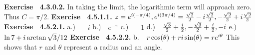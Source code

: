 {\noindent \protect \bf  Exercise ~4.3.0.2.} In taking the limit, the logarithmic term will approach zero. Thus $C=\pi /2$. \protect \newline  \protect \newline  
 {\noindent \protect \bf  Exercise ~4.5.1.1.} $z=e^{i (-\pi /4)}, e^{i(3 \pi /4)} = \protect \frac  {\protect \sqrt  {2}}{2} - i \protect \frac  {\protect \sqrt  {2}}{2},-\protect \frac  {\protect \sqrt  {2}}{2} + i \protect \frac  {\protect \sqrt  {2}}{2}$  \protect \newline  \protect \newline  
 {\noindent \protect \bf  Exercise ~4.5.2.1.} a.)~~$-i$ \protect \newline  b.)~~$e^{-\pi }$ \protect \newline  c.)~~$-1$ \protect \newline  d.)~~$\protect \frac  {\protect \sqrt  {3}}{2} + \protect \frac  {i}{2}, -\protect \frac  {\protect \sqrt  {3}}{2} + \protect \frac  {i}{2}, -i$ \protect \newline  e.)~~$\protect \qopname  \relax o{ln}{7} + i \protect \qopname  \relax o{arctan}{\protect \sqrt  {3}/12}$  \protect \newline  \protect \newline  
 {\noindent \protect \bf  Exercise ~4.5.2.2.} b.~~$r\protect \qopname  \relax o{cos}(\theta )+ri \protect \qopname  \relax o{sin}(\theta ) = re^{i \theta }$ This shows that $r$ and $\theta $ represent a radius and an angle.  \protect \newline  \protect \newline  
